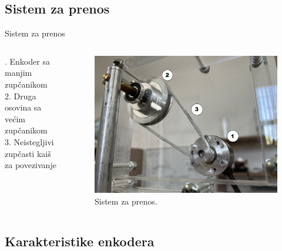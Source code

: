 \documentclass[aspectratio=169,xcolor=dvipsnames]{beamer}
\begin{document}

\subsection{Sistem za prenos}

\begin{frame}{Sistem za prenos}
    
    
    \begin{columns}[c]
    \begin{column}{.4\textwidth}
    . Enkoder sa manjim zupčanikom \\
    		 2. Druga osovina sa većim zupčanikom \\
    		 3. Neistegljivi zupčasti kaiš za povezivanje \\
    \end{column}
    \begin{column}{.6\textwidth}
    \begin{figure}
    \includegraphics[width=0.8\linewidth]{master_fig/prenos2.jpeg}
    \caption{Sistem za prenos.}
    \end{figure}
    \end{column}
\end{columns}
    
    
\end{frame}


\subsection{Karakteristike enkodera}
\end{document}
